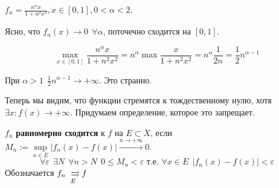 \begin{example}
    $f_n = \frac{n^\alpha x}{1 + n^2x^2}, x\in[0, 1], 0 < \alpha < 2$.

    Ясно, что $f_n(x)\to0 \ \ \forall \alpha$, поточечно сходится на $[0, 1]$.

    $$\max_{x\in[0, 1]}\frac{n^\alpha x}{1 + n^2x^2} = n^\alpha \max\frac{x}{1+n^2x^2} = n^\alpha \frac{1}{2n} = \frac{1}{2}n^{\alpha - 1}$$

    При $\alpha > 1 \ \ \frac{1}{2}n^{\alpha-1}\to+\infty$. Это странно.

    \begin{minipage}{\linewidth}
        \centering
        \begin{minipage}{0.3\linewidth}
            Теперь мы видим, что функции стремятся к тождественному нулю, хотя $\exists x : f(x)\to+\infty$. Придумаем определение, которое это запрещает.
        \end{minipage}
        \hspace{0.05\linewidth}
        \begin{minipage}{0.6\linewidth}
        \end{minipage}
    \end{minipage}
\end{example}

\begin{definition}
    $f_n$ \textbf{равномерно сходится} к $f$ на $E\subset X$, если $M_n := \sup\limits_{x\in E} |f_n(x)-f(x)|\xrightarrow{n\to+\infty}0$.
    $$\forall \varepsilon \ \ \exists N \ \ \forall n > N \ \ 0\le M_n < \varepsilon \text{ т.е. } \forall x\in E \ \ |f_n(x) - f(x)| < \varepsilon$$
    Обозначается $f_n\xrightrightarrows[E]{} f$
\end{definition}

